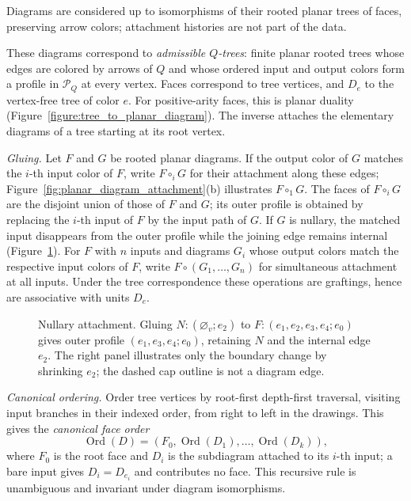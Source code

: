 \documentclass[11pt,letterpaper]{article}
\numberwithin{equation}{section}
\theoremstyle{plain}
\theoremstyle{definition}
\theoremstyle{remark}
\begin{document}
Diagrams are considered up to isomorphisms of their rooted planar trees
of faces, preserving arrow colors;
attachment histories are not part of the data.

These diagrams correspond to \textit{admissible $Q$-trees}: finite planar rooted
trees whose edges are colored by arrows of $Q$ and whose ordered input
and output colors form a profile in $\mathcal P_Q$ at every vertex.
Faces correspond to tree vertices, and $D_e$ to the vertex-free tree of
color $e$. For positive-arity faces, this is planar duality
(Figure~\ref{figure:tree_to_planar_diagram}). The inverse attaches the
elementary diagrams of a tree starting at its root vertex.

\medskip
\noindent\textit{Gluing.}
Let $F$ and $G$ be rooted planar diagrams. If the output color of $G$
matches the $i$-th input color of $F$, write $F\circ_iG$ for their
attachment along these edges;
Figure~\ref{fig:planar_diagram_attachment}(b) illustrates $F\circ_1G$.
The faces of $F\circ_iG$ are the disjoint union of those of $F$
and $G$; its outer profile is obtained by replacing the $i$-th input of
$F$ by the input path of $G$. If $G$ is nullary, the matched input
disappears from the outer profile while the joining edge remains
internal (Figure~\ref{fig:nullary_face_attachment}).
For $F$ with $n$ inputs and diagrams $G_i$
whose output colors match the respective input colors of $F$, write
$F\circ(G_1,\ldots,G_n)$ for simultaneous attachment at all inputs.
Under the tree correspondence these operations are graftings, hence
are associative with units $D_e$.

\begin{figure}[htbp]
\centering
\resizebox{\linewidth}{!}{}
\caption{Nullary attachment. Gluing $N:(\varnothing_v;e_2)$ to
$F:(e_1,e_2,e_3,e_4;e_0)$ gives outer profile $(e_1,e_3,e_4;e_0)$,
retaining $N$ and the internal edge $e_2$. The right panel illustrates
only the boundary change by shrinking $e_2$; the dashed cap outline
is not a diagram edge.}
\label{fig:nullary_face_attachment}
\end{figure}

\medskip
\noindent\textit{Canonical ordering.}
Order tree vertices by root-first depth-first traversal, visiting input
branches in their indexed order, from right to left in the drawings.
This gives the \textit{canonical face order}
\[
 \operatorname{Ord}(D)=
 (F_0,\operatorname{Ord}(D_1),\ldots,\operatorname{Ord}(D_k)),
\]
where $F_0$ is the root face and $D_i$ is the subdiagram attached to its
$i$-th input;
a bare input gives $D_i=D_{e_i}$ and contributes no face. This recursive
rule is unambiguous and invariant under diagram isomorphisms.
\end{document}
